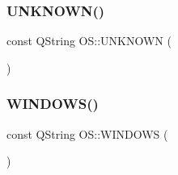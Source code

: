 \mbox{\label{namespace_o_s_a03d369686c450602db02bac63d973c99}} 
\subsubsection{\texorpdfstring{U\+N\+K\+N\+O\+W\+N()}{UNKNOWN()}}
{\footnotesize\ttfamily const Q\+String O\+S\+::\+U\+N\+K\+N\+O\+WN (\begin{DoxyParamCaption}\item[{\char`\"{}unknown\char`\"{}}]{ }\end{DoxyParamCaption})}

\mbox{\label{namespace_o_s_a2dcd39954f1ad7e384ddc37ae70e4088}} 
\subsubsection{\texorpdfstring{W\+I\+N\+D\+O\+W\+S()}{WINDOWS()}}
{\footnotesize\ttfamily const Q\+String O\+S\+::\+W\+I\+N\+D\+O\+WS (\begin{DoxyParamCaption}\item[{\char`\"{}windows\char`\"{}}]{ }\end{DoxyParamCaption})}

